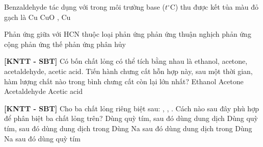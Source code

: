 \documentclass[12pt,a4paper]{article}
\begin{document}
\begin{ex}
Benzaldehyde tác dụng với  trong môi trường base ($t^\circ\text{C}$) thu được kết tủa màu đỏ gạch là
\choice
{Cu}
{\True {}}
{CuO}
{, Cu}

\end{ex}

\begin{ex}
Phản ứng giữa  với HCN thuộc loại phản ứng
\choice
{phản ứng thuận nghịch}
{\True phản ứng cộng}
{phản ứng thế}
{phản ứng phân hủy}

\end{ex}

\begin{ex}
\textbf{[KNTT - SBT]} Có bốn chất lỏng có thể tích bằng nhau là ethanol, acetone, acetaldehyde, acetic acid. Tiến hành chưng cất hỗn hợp này, sau một thời gian, hàm lượng chất nào trong bình chưng cất còn lại lớn nhất?
\choice
{Ethanol}
{Acetone}
{Acetaldehyde}
{\True Acetic acid}

\end{ex}

\begin{ex}
\textbf{[KNTT - SBT]} Cho ba chất lỏng riêng biệt sau: , , . Cách nào sau đây phù hợp để phân biệt ba chất lỏng trên?
\choice
{Dùng quỳ tím, sau đó dùng dung dịch }
{\True Dùng quỳ tím, sau đó dùng dung dịch  trong }
{Dùng Na sau đó dùng dung dịch  trong }
{Dùng Na sau đó dùng quỳ tím}

\end{ex}
\end{document}
